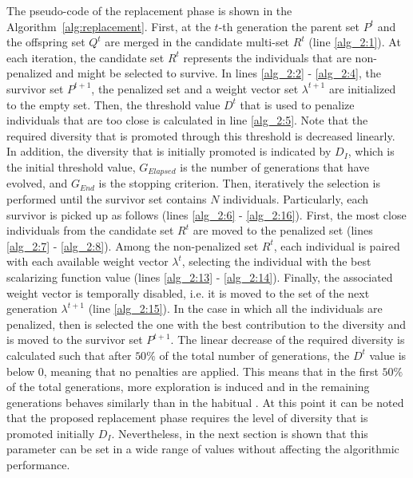 %
The pseudo-code of the replacement phase is shown in the Algorithm~\ref{alg:replacement}.
%
First, at the $t$-th generation the parent set $P^t$ and the offspring set $Q^t$ are merged in the candidate multi-set $R^t$ (line \ref{alg_2:1}).
%
At each iteration, the candidate set $R^t$ represents the individuals that are non-penalized and might be selected to survive.
%
In lines \ref{alg_2:2} - \ref{alg_2:4}, the survivor set $P^{t+1}$, the penalized set and a weight vector set $\lambda^{t+1}$ are initialized to the empty set.
%
Then, the threshold value $D^t$ that is used to penalize individuals that are too close is calculated in line \ref{alg_2:5}.
%
Note that the required diversity that is promoted through this threshold is decreased linearly.
%
In addition, the diversity that is initially promoted is indicated by $D_I$, which is the initial threshold value, $G_{Elapsed}$ is the number of generations that have evolved, and $G_{End}$ is the stopping criterion.
%
Then, iteratively the selection is performed until the survivor set contains $N$ individuals.
%
Particularly, each survivor is picked up as follows (lines \ref{alg_2:6} - \ref{alg_2:16}).
%
First, the most close individuals from the candidate set $R^t$ are moved to the penalized set (lines \ref{alg_2:7} - \ref{alg_2:8}).
%
Among the non-penalized set $R^t$, each individual is paired with each available weight vector $\lambda^t$, selecting the individual with the best scalarizing function value (lines \ref{alg_2:13} - \ref{alg_2:14}).
%
Finally, the associated weight vector is temporally disabled, i.e. it is moved to the set of the next generation $\lambda^{t+1}$ (line \ref{alg_2:15}).
%
In the case in which all the individuals are penalized, then is selected the one with the best contribution to the diversity and is moved to the survivor set $P^{t+1}$.
%
The linear decrease of the required diversity is calculated such that after $50\%$ of the total number of generations, the $D^t$ value is below 0, meaning that no penalties are applied.
%
This means that in the first $50\%$ of the total generations, more exploration is induced and in the remaining generations \VSDMOEAD{} behaves similarly than in the habitual \MOEAS{}.
%
At this point it can be noted that the proposed replacement phase requires the level of diversity that is promoted initially $D_I$.
%
Nevertheless, in the next section is shown that this parameter can be set in a wide range of values without affecting the algorithmic performance.


